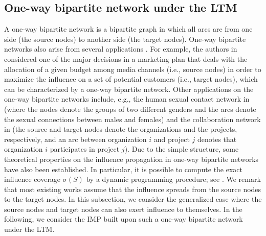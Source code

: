 \documentclass[a4paper,10pt]{article}
\theoremstyle{plain}
\newcommand{\rev}[1]{{\color{black}#1}}
\newcommand{\revv}[1]{{#1}}
\begin{document}
	
	
	\subsection{One-way bipartite \revv{network} under the LTM}\label{subsect:obg}
	{
		A one-way bipartite \revv{network} is a bipartite graph in which all arcs are from one side (the source nodes) to another side (the target nodes). 
		One-way bipartite \revv{networks} also arise from several applications \cite{alon2012optimizing,berardo2014,ERGUN2002,hatano2016adaptive,soma2014optimal}.
		For example, the authors in \cite{alon2012optimizing,hatano2016adaptive,soma2014optimal} considered one of the major decisions in a marketing plan that deals with the allocation of a given budget among media channels (i.e., source nodes) in order to maximize the influence on a set of potential customers (i.e., target nodes), which can be characterized by a one-way bipartite \revv{network}.
		\rev{Other applications on the one-way bipartite \revv{networks}} include, e.g., the human sexual contact network in \cite{ERGUN2002} (where the nodes denote the groups of two different
		genders and the arcs denote the sexual connections between males and females) and the collaboration
		network in \cite{berardo2014} (the source and target nodes denote  the organizations and the projects, respectively, and an arc between organization $i$ and project $j$ denotes that organization $i$ participates in project $j$).
		\rev{Due to the simple structure, some theoretical properties on the influence propagation in one-way bipartite \revv{networks} have also been established.
			In particular, it is possible to compute the exact influence coverage $\sigma(S)$ by a dynamic programming procedure; see \cite{Wu2019,Zhang2014}.}
		We remark that most existing works assume that the influence spreads from the source nodes to the target nodes.
		In this subsection, we consider the generalized case where the source nodes and target nodes can also exert influence to themselves. 
		In the following, we consider the IMP built upon such a one-way bipartite \revv{network} under the LTM.
		
}
\end{document}
